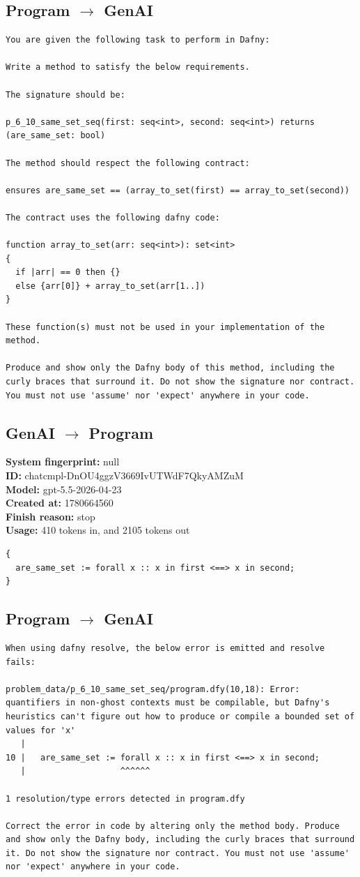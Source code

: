 \documentclass{article}
\begin{document}
\subsection*{Program $\rightarrow$ GenAI}
\begin{lstlisting}
You are given the following task to perform in Dafny:

Write a method to satisfy the below requirements.

The signature should be:

p_6_10_same_set_seq(first: seq<int>, second: seq<int>) returns (are_same_set: bool)

The method should respect the following contract:

ensures are_same_set == (array_to_set(first) == array_to_set(second))

The contract uses the following dafny code:

function array_to_set(arr: seq<int>): set<int>
{
  if |arr| == 0 then {}
  else {arr[0]} + array_to_set(arr[1..])
}

These function(s) must not be used in your implementation of the method.

Produce and show only the Dafny body of this method, including the curly braces that surround it. Do not show the signature nor contract. You must not use 'assume' nor 'expect' anywhere in your code.
\end{lstlisting}
\subsection*{GenAI $\rightarrow$ Program}
\textbf{System fingerprint: }null
\\\textbf{ID: }chatcmpl-DnOU4ggzV3669IvUTWdF7QkyAMZuM
\\\textbf{Model: }gpt-5.5-2026-04-23
\\\textbf{Created at: }1780664560
\\\textbf{Finish reason: }stop
\\\textbf{Usage: }410 tokens in, and 2105 tokens out
\begin{lstlisting}
{
  are_same_set := forall x :: x in first <==> x in second;
}
\end{lstlisting}
\subsection*{Program $\rightarrow$ GenAI}
\begin{lstlisting}
When using dafny resolve, the below error is emitted and resolve fails:

problem_data/p_6_10_same_set_seq/program.dfy(10,18): Error: quantifiers in non-ghost contexts must be compilable, but Dafny's heuristics can't figure out how to produce or compile a bounded set of values for 'x'
   |
10 |   are_same_set := forall x :: x in first <==> x in second;
   |                   ^^^^^^

1 resolution/type errors detected in program.dfy

Correct the error in code by altering only the method body. Produce and show only the Dafny body, including the curly braces that surround it. Do not show the signature nor contract. You must not use 'assume' nor 'expect' anywhere in your code.
\end{lstlisting}
\end{document}
